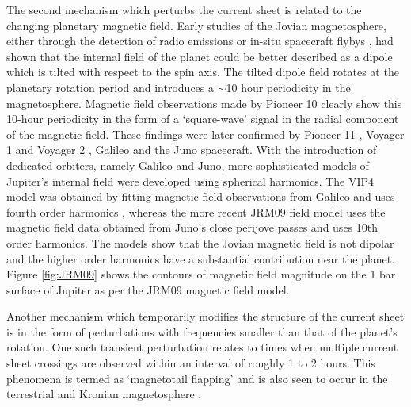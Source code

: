 The second mechanism which perturbs the current sheet is related to the changing planetary magnetic field. Early studies of the Jovian magnetosphere, either through the detection of radio emissions \cite{Carr1969TheJupiter} or in-situ spacecraft flybys \cite{Smith1974The10}, had shown that the internal field of the planet could be better described as a dipole which is tilted with respect to the spin axis. The tilted dipole field rotates at the planetary rotation period and introduces a $\sim$10 hour periodicity in the magnetosphere. Magnetic field observations made by Pioneer 10 \cite{Smith1974The10} clearly show this 10-hour periodicity in the form of a `square-wave' signal in the radial component of the magnetic field. These findings were later confirmed by Pioneer 11 \cite{Smith1975Jupiters11}, Voyager 1 and Voyager 2 \cite{Behannon1981}, Galileo \cite{Khurana1992a, Khurana2005} and the Juno spacecraft. With the introduction of dedicated orbiters, namely Galileo and Juno, more sophisticated models of Jupiter's internal field were developed using spherical harmonics. The VIP4 model was obtained by fitting magnetic field observations from Galileo and uses fourth order harmonics \cite{Connerney1998NewFootprint}, whereas the more recent JRM09 field model \cite{Connerney2018} uses the magnetic field data obtained from Juno's close perijove passes and uses 10th order harmonics. The models show that the Jovian magnetic field is not dipolar and the higher order harmonics have a substantial contribution near the planet. Figure \ref{fig:JRM09} shows the contours of magnetic field magnitude on the 1 bar surface of Jupiter as per the JRM09 magnetic field model.

Another mechanism which temporarily modifies the structure of the current sheet is in the form of perturbations with frequencies smaller than that of the planet's rotation. One such transient perturbation relates to times when multiple current sheet crossings are observed within an interval of roughly 1 to 2 hours. This phenomena is termed as `magnetotail flapping' and is also seen to occur in the terrestrial and Kronian magnetosphere \cite{Volwerk2013ComparativeSaturn}. 

